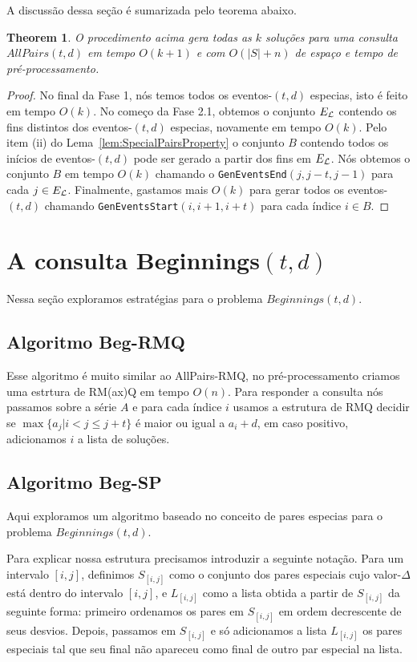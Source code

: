 \documentclass[12pt]{article}
\newtheorem{thm}{Theorem}[section]
\begin{document}
A discussão dessa seção é sumarizada pelo teorema abaixo.

\begin{thm}
O procedimento acima gera todas as $k$ soluções para uma consulta $AllPairs(t, d)$ em tempo $O(k + 1)$
e com $O(|S| + n)$ de espaço e tempo de pré-processamento.
\end{thm}
\begin{proof}
No final da Fase 1, nós temos todos os eventos-$(t,d)$ especias,
isto é feito em tempo $O(k)$. No começo da Fase 2.1,
obtemos o conjunto $E_{\cal{L}}$ contendo os fins distintos dos eventos-$(t,d)$ especias,
novamente em tempo $O(k)$. Pelo item (ii) do Lema~\ref{lem:SpecialPairsProperty}
o conjunto $B$ contendo todos os inícios de eventos-$(t,d)$ pode ser gerado a partir
dos fins em $E_{\cal{L}}$. Nós obtemos o conjunto $B$ em tempo $O(k)$ chamando o {\tt GenEventsEnd}$(j,j-t,j-1)$
para cada $j \in E_{\cal{L}}$. Finalmente, gastamos mais $O(k)$ para gerar todos os eventos-$(t,d)$
chamando {\tt GenEventsStart}$(i,i+1,i+t)$ para cada índice $i \in B$.
\end{proof}


\section{A consulta Beginnings$(t,d)$}

Nessa seção exploramos estratégias para o problema $Beginnings(t,d)$.

\subsection{Algoritmo Beg-RMQ}
Esse algoritmo é muito similar ao AllPairs-RMQ, no pré-processamento
criamos uma estrtura de RM(ax)Q em tempo $O(n)$. Para responder a consulta
nós passamos sobre a série $A$ e para cada índice $i$ usamos a estrutura
de RMQ decidir se $\max\{a_j | i < j \le j + t\}$ é maior ou igual a $a_i + d$,
em caso positivo, adicionamos $i$ a lista de soluções.

\subsection{Algoritmo Beg-SP}

Aqui exploramos um algoritmo baseado no conceito de pares especias para
o problema $Beginnings(t,d)$.

Para explicar nossa estrutura precisamos introduzir a seguinte notação.
Para um intervalo $[i, j]$, definimos $S_{[i,j]}$ como o conjunto
dos pares especiais cujo valor-$\Delta$ está dentro do intervalo $[i, j]$,
e $L_{[i, j]}$ como a lista obtida a partir de $S_{[i,j]}$ da seguinte forma:
 primeiro ordenamos os pares em $S_{[i, j]}$ em ordem decrescente de seus desvios. Depois, passamos em $S_{[i,j]}$
e só adicionamos a lista $L_{[i,j]}$ os pares especiais tal que seu final não apareceu como final de outro
par especial na lista.
\end{document}
